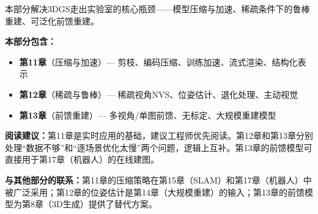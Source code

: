 \vspace{1em}
\begin{center}
\textcolor{techgray}{\small 本部分解决3DGS走出实验室的核心瓶颈——模型压缩与加速、稀疏条件下的鲁棒重建、可泛化前馈重建。}
\end{center}
\vspace{0.5em}

\noindent\textbf{本部分包含：}
\begin{itemize}[leftmargin=2em,itemsep=1pt]
\item[\textcolor{techpurple}{\textbullet}] \textbf{第11章}（压缩与加速）— 剪枝、编码压缩、训练加速、流式渲染、结构化表示
\item[\textcolor{techpurple}{\textbullet}] \textbf{第12章}（稀疏与鲁棒）— 稀疏视角NVS、位姿估计、退化处理、主动视觉
\item[\textcolor{techpurple}{\textbullet}] \textbf{第13章}（前馈重建）— 多视角/单图前馈、无标定、大规模重建模型
\end{itemize}

\noindent\textbf{阅读建议：}第11章是实时应用的基础，建议工程师优先阅读。第12章和第13章分别处理``数据不够''和``逐场景优化太慢''两个问题，逻辑上互补。第13章的前馈模型可直接用于第17章（机器人）的在线建图。

\noindent\textbf{与其他部分的联系：}第11章的压缩策略在第15章（SLAM）和第17章（机器人）中被广泛采用；第12章的位姿估计是第14章（大规模重建）的输入；第13章的前馈模型为第8章（3D生成）提供了替代方案。

\vspace{1em}
